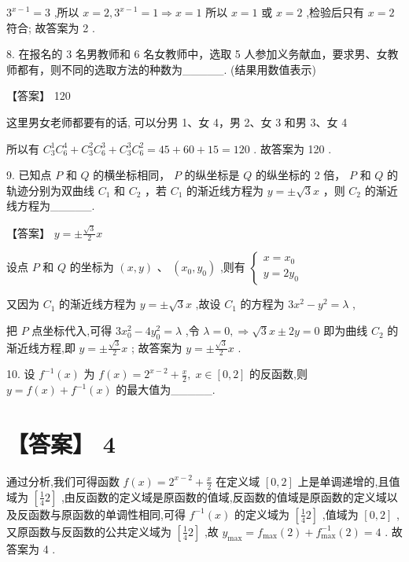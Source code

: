 \documentclass[10pt]{article}
\begin{document}
\({3}^{x - 1} = 3\) ,所以 \(x = 2,{3}^{x - 1} = 1 \Rightarrow  x = 1\) 所以 \(x = 1\) 或 \(x = 2\) ,检验后只有 \(x = 2\) 符合; 故答案为 2 .

8. 在报名的 3 名男教师和 6 名女教师中，选取 5 人参加义务献血，要求男、女教师都有，则不同的选取方法的种数为\_\_\_\_\_. (结果用数值表示)

【答案】 120

这里男女老师都要有的话, 可以分男 1、女 4，男 2、女 3 和男 3、女 4

所以有 \({C}_{3}^{1}{C}_{6}^{4} + {C}_{3}^{2}{C}_{6}^{3} + {C}_{3}^{3}{C}_{6}^{2} = {45} + {60} + {15} = {120}\) . 故答案为 120 .

9. 已知点 \(P\) 和 \(Q\) 的横坐标相同， \(P\) 的纵坐标是 \(Q\) 的纵坐标的 2 倍， \(P\) 和 \(Q\) 的轨迹分别为双曲线 \({C}_{1}\) 和 \({C}_{2}\) ，若 \({C}_{1}\) 的渐近线方程为 \(y =  \pm  \sqrt{3}x\) ，则 \({C}_{2}\) 的渐近线方程为\_\_\_\_\_.

【答案】 \(y =  \pm  \frac{\sqrt{3}}{2}x\)

设点 \(P\) 和 \(Q\) 的坐标为 \(\left( {x,y}\right) \text{ 、 }\left( {{x}_{0},{y}_{0}}\right)\) ,则有 \(\left\{  \begin{array}{l} x = {x}_{0} \\  y = 2{y}_{0} \end{array}\right.\)

又因为 \({C}_{1}\) 的渐近线方程为 \(y =  \pm  \sqrt{3}x\) ,故设 \({C}_{1}\) 的方程为 \(3{x}^{2} - {y}^{2} = \lambda\) ,

把 \(P\) 点坐标代入,可得 \(3{x}_{0}^{2} - 4{y}_{0}^{2} = \lambda\) ,令 \(\lambda  = 0, \Rightarrow  \sqrt{3}x \pm  {2y} = 0\) 即为曲线 \({C}_{2}\) 的渐近线方程,即 \(y =  \pm  \frac{\sqrt{3}}{2}x\) ; 故答案为 \(y =  \pm  \frac{\sqrt{3}}{2}x\) .

10. 设 \({f}^{-1}\left( x\right)\) 为 \(f\left( x\right)  = {2}^{x - 2} + \frac{x}{2},\;x \in  \left\lbrack  {0,2}\right\rbrack\) 的反函数,则 \(y = f\left( x\right)  + {f}^{-1}\left( x\right)\) 的最大值为\_\_\_\_\_.

\section*{【答案】 4}

通过分析,我们可得函数 \(f\left( x\right)  = {2}^{x - 2} + \frac{x}{2}\) 在定义域 \(\left\lbrack  {0,2}\right\rbrack\) 上是单调递增的,且值域为 \(\left\lbrack  {\frac{1}{4}2}\right\rbrack\) ,由反函数的定义域是原函数的值域,反函数的值域是原函数的定义域以及反函数与原函数的单调性相同,可得 \({f}^{-1}\left( x\right)\) 的定义域为 \(\left\lbrack  {\frac{1}{4}2}\right\rbrack\) ,值域为 \(\left\lbrack  {0,2}\right\rbrack\) ,又原函数与反函数的公共定义域为 \(\left\lbrack  {\frac{1}{4}2}\right\rbrack\) ,故 \({y}_{\max } = {f}_{\max }\left( 2\right)  + {f}_{\max }^{-1}\left( 2\right)  = 4\) . 故答案为 4 .
\end{document}
